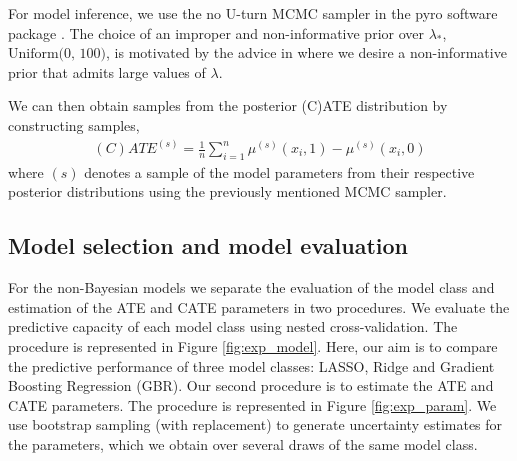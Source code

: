 \documentclass[12pt, a4paper]{article}
\begin{document}
For model inference, we use the no U-turn MCMC sampler \citep{hoffman2014} in
the pyro software package \citep{bingham2019}. The choice of an improper and
non-informative prior over $\lambda_*$, $\textrm{Uniform(0, 100)}$, is
motivated by the advice in \citet{gelman2006} where we desire a non-informative
prior that admits large values of $\lambda$. 

We can then obtain samples from the posterior (C)ATE distribution by constructing
samples,
\begin{align*}
  (C)ATE^{(s)} = \frac{1}{n} \sum_{i=1}^{n} \mu^{(s)}(x_i, 1) - \mu^{(s)}(x_i, 0)
\end{align*}
where $(s)$ denotes a sample of the model parameters from their respective
posterior distributions using the previously mentioned MCMC sampler.


%




\subsection{Model selection and model evaluation}

For the non-Bayesian models we separate the evaluation of the model class and estimation of the ATE and CATE parameters in two procedures. We evaluate the predictive capacity of each model class using nested cross-validation. The procedure is represented in Figure \ref{fig:exp_model}. Here, our aim is to compare the predictive performance of three model classes: LASSO, Ridge and Gradient Boosting Regression (GBR). Our second procedure is to estimate the ATE and CATE parameters. The procedure is represented in Figure \ref{fig:exp_param}. We use bootstrap sampling (with replacement) to generate uncertainty estimates for the parameters, which we obtain over several draws of the same model class. 
\end{document}
